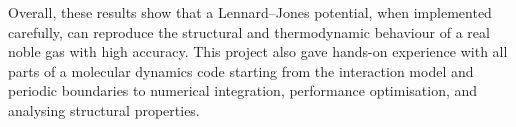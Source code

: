 Overall, these results show that a Lennard–Jones potential, when implemented carefully, can reproduce the structural and thermodynamic behaviour of a real noble gas with high accuracy. This project also gave hands-on experience with all parts of a molecular dynamics code starting from the interaction model and periodic boundaries to numerical integration, performance optimisation, and analysing structural properties.


